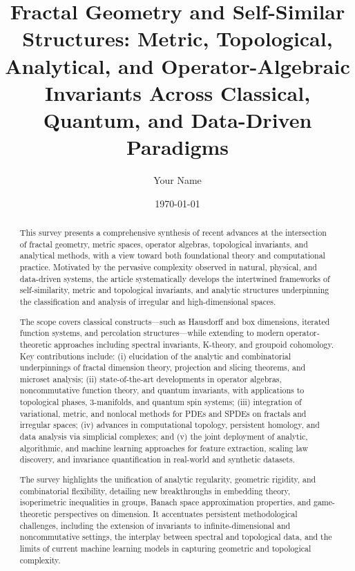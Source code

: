 \documentclass[11pt]{article}
\begin{document}
\author{Your Name}
\date{\today}

\title{\title{Fractal Geometry and Self-Similar Structures: Metric, Topological, Analytical, and Operator-Algebraic Invariants Across Classical, Quantum, and Data-Driven Paradigms}}
\maketitle

\begin{abstract}
This survey presents a comprehensive synthesis of recent advances at the intersection of fractal geometry, metric spaces, operator algebras, topological invariants, and analytical methods, with a view toward both foundational theory and computational practice. Motivated by the pervasive complexity observed in natural, physical, and data-driven systems, the article systematically develops the intertwined frameworks of self-similarity, metric and topological invariants, and analytic structures underpinning the classification and analysis of irregular and high-dimensional spaces. 

The scope covers classical constructs—such as Hausdorff and box dimensions, iterated function systems, and percolation structures—while extending to modern operator-theoretic approaches including spectral invariants, K-theory, and groupoid cohomology. Key contributions include: (i) elucidation of the analytic and combinatorial underpinnings of fractal dimension theory, projection and slicing theorems, and microset analysis; (ii) state-of-the-art developments in operator algebras, noncommutative function theory, and quantum invariants, with applications to topological phases, 3-manifolds, and quantum spin systems; (iii) integration of variational, metric, and nonlocal methods for PDEs and SPDEs on fractals and irregular spaces; (iv) advances in computational topology, persistent homology, and data analysis via simplicial complexes; and (v) the joint deployment of analytic, algorithmic, and machine learning approaches for feature extraction, scaling law discovery, and invariance quantification in real-world and synthetic datasets.

The survey highlights the unification of analytic regularity, geometric rigidity, and combinatorial flexibility, detailing new breakthroughs in embedding theory, isoperimetric inequalities in groups, Banach space approximation properties, and game-theoretic perspectives on dimension. It accentuates persistent methodological challenges, including the extension of invariants to infinite-dimensional and noncommutative settings, the interplay between spectral and topological data, and the limits of current machine learning models in capturing geometric and topological complexity.


\end{abstract}
\end{document}
